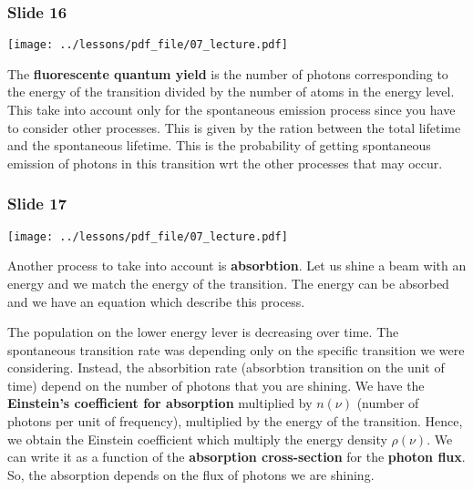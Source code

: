 \documentclass[../main/main.tex]{subfiles}
\begin{document}
\subsubsection*{Slide 16}

\begin{minipage}[]{0.5\linewidth}
\centering
\texttt{[image: ../lessons/pdf\_file/07\_lecture.pdf]}
\end{minipage}
\hspace{0.3cm}\vspace{0.3cm}
\begin{minipage}[c]{0.47\linewidth}

The \textbf{fluorescente quantum yield} is the number of photons corresponding to the energy of the transition divided by the number of atoms in the energy level. This take into account only for the spontaneous emission process since you have to consider other processes. This is given by the ration between the total lifetime and the spontaneous lifetime. This is the probability of getting spontaneous emission of photons in this transition wrt the other processes that may occur.

\end{minipage}

\subsubsection*{Slide 17}

\begin{minipage}[]{0.5\linewidth}
\centering
\texttt{[image: ../lessons/pdf\_file/07\_lecture.pdf]}
\end{minipage}
\hspace{0.3cm}\vspace{0.3cm}
\begin{minipage}[c]{0.47\linewidth}

Another process to take into account is \textbf{absorbtion}. Let us shine a beam with an energy and we match the energy of the transition. The energy can be absorbed and we have an equation which describe this process.

The population on the lower energy lever is decreasing over time. The spontaneous transition rate was depending only on the specific transition we were considering. Instead, the absorbition rate (absorbtion transition on the unit of time) depend on the number of photons that you are shining.
We have the \textbf{Einstein's coefficient for absorption} multiplied by \( n ( \nu ) \) (number of photons per unit of frequency), multiplied by the energy of the transition. Hence, we obtain the Einstein coefficient which multiply the energy density \( \rho (\nu ) \). We can write it as a function of the \textbf{absorption cross-section} for the \textbf{photon flux}.
So, the absorption depends on the flux of photons we are shining.

\end{minipage}
\end{document}
